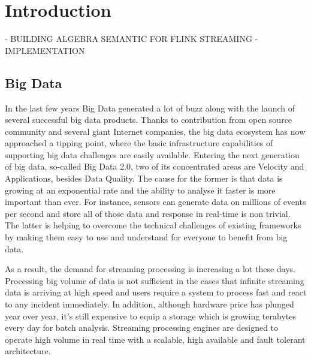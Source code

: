 
\chapter{Introduction}

\ifpdf
    \graphicspath{{Chapter1/Figs/Raster/}{Chapter1/Figs/PDF/}{Chapter1/Figs/}}
\else
    \graphicspath{{Chapter1/Figs/Vector/}{Chapter1/Figs/}}
\fi

- BUILDING ALGEBRA SEMANTIC FOR FLINK STREAMING
- IMPLEMENTATION
\section*{Big Data}
In the last few years Big Data generated a lot of buzz along with the launch of several successful big data products. Thanks to contribution from open source community and several giant Internet companies, the big data ecosystem has now approached a tipping point, where the basic infrastructure capabilities of supporting big data challenges are easily available. Entering the next generation of big data, so-called Big Data 2.0, two of its concentrated areas are Velocity and Applications, besides Data Quality. The cause for the former is that data is growing at an exponential rate and the ability to analyse it faster is more important than ever. For instance, sensors can generate data on millions of events per second and store all of those data and response in real-time is non trivial. The latter is helping to overcome the technical challenges of existing frameworks by making them easy to use and understand for everyone to benefit from big data.

As a result, the demand for streaming processing is increasing a lot these days. Processing big volume of data is not sufficient in the cases that infinite streaming data is arriving at high speed and users require a system to process fast and react to any incident immediately. In addition, although hardware price has plunged year over year, it’s still expensive to equip a storage which is growing terabytes every day for batch analysis.  Streaming processing engines are designed to operate high volume in real time with a scalable, high available and fault tolerant architecture.

